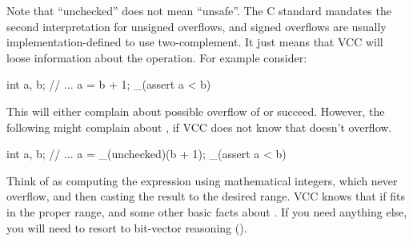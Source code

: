 Note that ``unchecked'' does not mean ``unsafe''.
The C standard mandates the second interpretation for unsigned overflows,
and signed overflows are usually implementation-defined to use two-complement.
It just means that VCC will loose information about the operation.
For example consider:
\begin{VCC}
int a, b;
// ...
a = b + 1;
_(assert a < b)
\end{VCC}
This will either complain about possible overflow of  or succeed.
However, the following might complain about , if VCC does not know
that  doesn't overflow.
\begin{VCC}
int a, b;
// ...
a = _(unchecked)(b + 1);
_(assert a < b)
\end{VCC}
Think of  as computing the expression using mathematical 
integers, which never overflow, and then casting the result to the desired range.
VCC knows that  if  fits in the proper range,
and some other basic facts about .
If you need anything else, you will need to resort to bit-vector
reasoning ().


